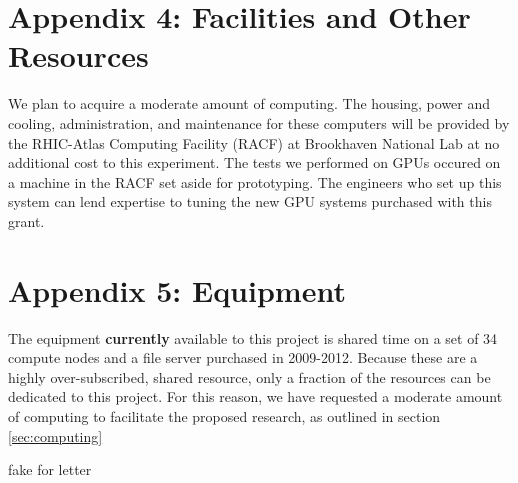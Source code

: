 \documentclass[12pt]{article}
\begin{document}
\newpage
{}
\section*{Appendix 4: Facilities and Other Resources}

We plan to acquire a moderate amount of computing.  The housing, power and
cooling, administration, and maintenance for these computers will be provided
by the RHIC-Atlas Computing Facility (RACF) at Brookhaven National Lab at no
additional cost to this experiment.	The tests we performed on GPUs occured on a
machine in the RACF set aside for prototyping.  The engineers who set up this
system can lend expertise to tuning the new GPU systems purchased with this
grant.

\newpage
{}
\section*{Appendix 5: Equipment}

The equipment {\bf currently} available to this project is shared time on a set
of 34 compute nodes and a file server purchased in 2009-2012.  
Because these are a highly over-subscribed, shared resource, only a fraction of
the resources can be dedicated to this project.  For this reason, we have requested
a moderate amount of computing to facilitate the proposed research, as outlined
in section \ref{sec:computing}

\newpage
{}
fake for letter
\end{document}

